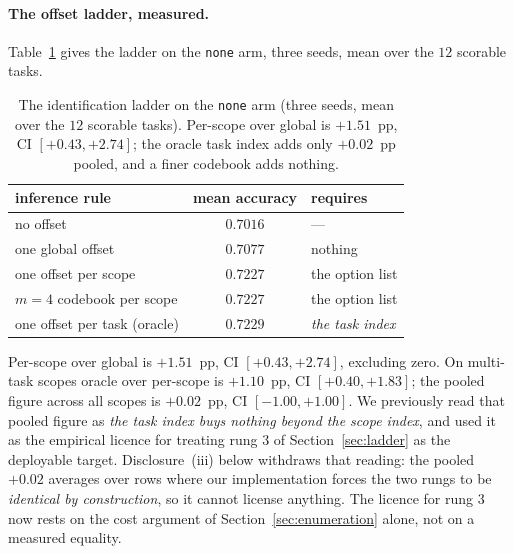 \paragraph{The offset ladder, measured.}
Table~\ref{tab:offset-ladder} gives the ladder on the \texttt{none} arm, three
seeds, mean over the $12$ scorable tasks.
\begin{table}[t]
\centering
\small
\caption{The identification ladder on the \texttt{none} arm (three seeds, mean over
the $12$ scorable tasks). Per-scope over global is $+1.51$~pp, CI $[+0.43,+2.74]$;
the oracle task index adds only $+0.02$~pp pooled, and a finer codebook adds
nothing.}
\label{tab:offset-ladder}
\begin{tabular}{lcl}
\toprule
inference rule & mean accuracy & requires \\
\midrule
no offset                       & $0.7016$ & --- \\
one global offset               & $0.7077$ & nothing \\
one offset per scope            & $0.7227$ & the option list \\
$m=4$ codebook per scope        & $0.7227$ & the option list \\
one offset per task (oracle)    & $0.7229$ & \emph{the task index} \\
\bottomrule
\end{tabular}
\end{table}
Per-scope over global is $\mathbf{+1.51}$~pp, CI $[+0.43,+2.74]$, excluding zero.
On multi-task scopes oracle over per-scope is $+1.10$~pp, CI $[+0.40,+1.83]$; the
pooled figure across all scopes is $+0.02$~pp, CI $[-1.00,+1.00]$. We previously
read that pooled figure as \emph{the task index buys nothing beyond the scope
index}, and used it as the empirical licence for treating rung 3 of
Section~\ref{sec:ladder} as the deployable target. Disclosure~(iii) below
withdraws that reading: the pooled $+0.02$ averages over rows where our
implementation forces the two rungs to be \emph{identical by construction}, so it
cannot license anything. The licence for
rung 3 now rests on the cost argument of Section~\ref{sec:enumeration} alone,
not on a measured equality.

